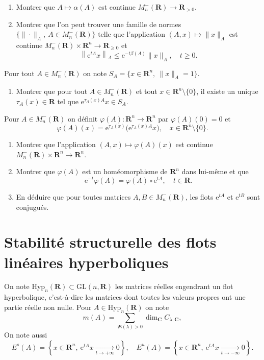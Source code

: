 \documentclass[a4paper,12pt]{article}
\theoremstyle{plain}
\theoremstyle{definition}
\newcommand{\e}{\mathrm{e}}
\newcommand{\R}{\mathbf{R}}
\newcommand{\C}{\mathbf{C}}
\begin{document}
\begin{enumerate}[resume, label=\textbf{\arabic*.}]
\item Montrer que $A \mapsto \alpha(A)$ est continue $M_n^{-}(\R) \to \R_{>0}$.
\item Montrer que l'on peut trouver une famille de normes $\{\|\cdot\|_A,~A \in M_n^{-}(\R)\}$ telle que l'application $(A,x) \mapsto \|x\|_A $ est continue $M_n^{-}(\R) \times \R^n \to \R_{\geqslant 0}$ et
$$
\left\|\e^{tA}x\right\|_A \leqslant \e^{-t\beta(A)}\|x\|_A, \quad t \geqslant 0.
$$
\end{enumerate}
Pour tout $A \in M_n^{-}(\R)$ on note $S_A = \{x \in \R^n,~\|x\|_A = 1\}$.
\begin{enumerate}[resume, label=\textbf{\arabic*.}]

\item Montrer que pour tout $A \in M_n^{-}(\R)$ et tout $x \in \R^n \setminus \{0\}$, il existe un unique $\tau_A(x) \in \R$ tel que $\e^{\tau_A(x)A}x \in S_A.$
\end{enumerate}
Pour $A \in M_n^{-}(\R)$ on d\'efinit $\varphi(A) : \R^n \to \R^n$ par $\varphi(A)(0) = 0$ et 
$$
\varphi(A)(x) = \e^{\tau_A(x)}\bigl(\e^{\tau_A(x)A}x\bigr), \quad x \in \R^n \setminus \{0\}.
$$ 
\begin{enumerate}[resume, label=\textbf{\arabic*.}]
\item Montrer que l'application $(A,x) \mapsto \varphi(A)(x)$ est continue $M_n^{-}(\R) \times \R^n \to \R^n$.

\item Montrer que $\varphi(A)$ est un hom\'eomorphisme de $\R^n$ dans lui-m\^eme et que
$$
\e^{-t} \varphi(A) = \varphi(A) \circ \e^{tA}, \quad t \in \R.
$$

\item En d\'eduire que pour toutes matrices $A,B \in M_n^{-}(\R)$, les flots $\e^{tA}$ et $\e^{tB}$ sont conjugu\'es.

\end{enumerate}

\section*{Stabilit\'e structurelle des flots lin\'eaires hyperboliques}

\noindent On note $\mathrm{Hyp}_n(\R) \subset \mathrm{GL}(n,\R)$ les matrices r\'eelles engendrant un flot hyperbolique, c'est-\`a-dire les matrices dont toutes les valeurs propres ont une partie r\'eelle non nulle. Pour $A \in \mathrm{Hyp}_n(\R)$ on note
$$
m(A) = \sum_{\Re(\lambda) > 0} \dim_\C C_{\lambda, \C},
$$
On note aussi
$$
E^s(A) = \left\{x \in \R^n, ~\e^{tA}x \underset{t \to +\infty}{\longrightarrow} 0\right\}, \quad E^u(A) = \left\{x \in \R^n, ~\e^{tA}x \underset{t \to -\infty}{\longrightarrow} 0\right\}.
$$
\end{document}
